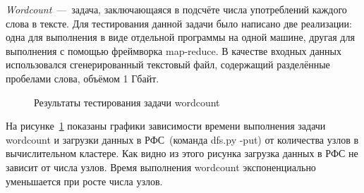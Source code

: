 \documentclass[12pt,a4paper,oneside]{extarticle}
\begin{document}
    {\it Wordcount}~---~задача, заключающаяся в подсчёте числа употреблений каждого слова в тексте. Для тестирования данной задачи было написано две реализации: одна для выполнения в виде отдельной программы на одной машине, другая для выполнения с помощью фреймворка map-reduce. В качестве входных данных использовался сгенерированный текстовый файл, содержащий разделённые пробелами слова, объёмом 1 Гбайт.
    
    \begin{figure}[h!]        
        \centering
        \caption{Результаты тестирования задачи wordcount}
        \label{pic:test_1}
    \end{figure}

    На рисунке~\ref{pic:test_1} показаны графики зависимости времени выполнения задачи wordcount и загрузки данных в РФС~(команда dfs.py -put) от количества узлов в вычислительном кластере. Как видно из этого рисунка загрузка данных в РФС не зависит от числа узлов. Время выполнения wordcount экспоненциально уменьшается при росте числа узлов.
\end{document}
